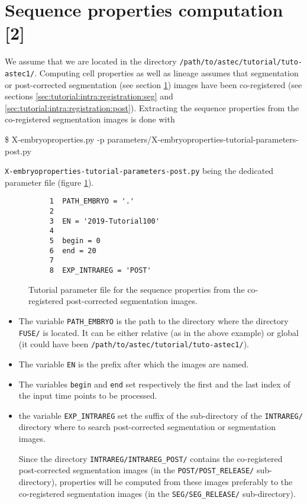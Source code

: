 \section{Sequence properties computation [2]}
\label{sec:tutorial:properties:post}

We assume that we are located in the directory
\texttt{/path/to/astec/tutorial/tuto-astec1/}.
Computing cell properties as well as lineage assumes that
 segmentation or post-corrected segmentation (see section
\ref{sec:tutorial:properties:post}) images have been
co-registered (see sections \ref{sec:tutorial:intra:registration:seg}
and \ref{sec:tutorial:intra:registration:post}). 
Extracting the sequence properties from the co-registered segmentation
images is
done with
\begin{code}{0.8}
  \$ X-embryoproperties.py -p parameters/X-embryoproperties-tutorial-parameters-post.py
\end{code}
\texttt{X-embryoproperties-tutorial-parameters-post.py} being the
dedicated parameter file  (figure \ref{fig:tutorial:parameter:properties:post}).

\begin{figure}
\begin{framed}
\begin{verbatim}
     1	PATH_EMBRYO = '.'
     2	
     3	EN = '2019-Tutorial100'
     4	
     5	begin = 0
     6	end = 20
     7	
     8	EXP_INTRAREG = 'POST'
\end{verbatim}
\end{framed}
\caption{\label{fig:tutorial:parameter:properties:post} Tutorial
  parameter file for the sequence properties from the co-registered
  post-corrected segmentation images.}
\end{figure}

\begin{itemize}
  \itemsep -1ex
  \item The variable \texttt{PATH\_EMBRYO} is the path to the directory where
    the directory \texttt{FUSE/} is located. It can be either relative (as in the
    above example) or
    global (it could have been \texttt{/path/to/astec/tutorial/tuto-astec1/}).
  \item The variable \texttt{EN} is the prefix after which the  images
    are named. 
  \item The variables \texttt{begin} and \texttt{end} set respectively the
    first and the last index of the input time points to be processed.
  \item  the variable \texttt{EXP\_INTRAREG} set the suffix of the
    sub-directory of the \texttt{INTRAREG/} directory where to search
    post-corrected segmentation or segmentation images.

    Since the directory \texttt{INTRAREG/INTRAREG\_POST/} 
    contains the co-registered post-corrected segmentation images (in the
    \texttt{POST/POST\_RELEASE/} sub-directory), properties will be computed from
    these images preferably to the co-registered segmentation images (in the
    \texttt{SEG/SEG\_RELEASE/} sub-directory).
\end{itemize}

